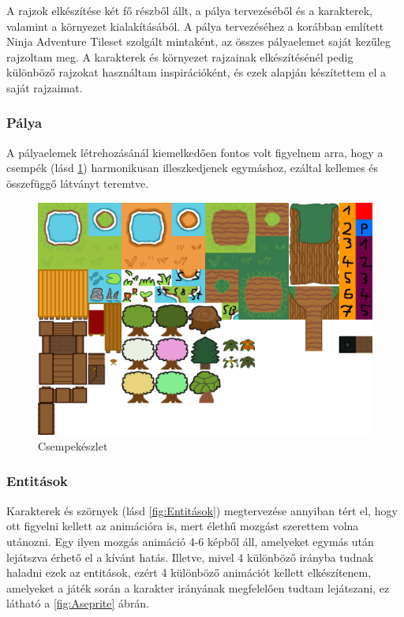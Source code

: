  A rajzok elkészítése két fő részből állt, a pálya tervezéséből és a karakterek, valamint a környezet kialakításából. A pálya tervezéséhez a korábban említett Ninja Adventure Tileset szolgált mintaként, az összes pályaelemet saját kezűleg rajzoltam meg. A karakterek és környezet rajzainak elkészítésénél pedig különböző rajzokat használtam inspirációként, és ezek alapján készítettem el a saját rajzaimat.

\subsubsection{Pálya}
 A pályaelemek létrehozásánál kiemelkedően fontos volt figyelnem arra, hogy a csempék (lásd \ref{fig:Csempekészlet}) harmonikusan illeszkedjenek egymáshoz, ezáltal kellemes és összefüggő látványt teremtve.

\begin{figure}[H]
    \centering
    \includegraphics[width=12.0truecm]{images/tileset.png}
    \caption{Csempekészlet}
    \label{fig:Csempekészlet}
\end{figure}

\subsubsection{Entitások}
 Karakterek és szörnyek (lásd \ref{fig:Entitások}) megtervezése annyiban tért el, hogy ott figyelni kellett az animációra is, mert élethű mozgást szerettem volna utánozni. Egy ilyen mozgás animáció 4-6 képből áll, amelyeket egymás után lejátszva érhető el a kívánt hatás. Illetve, mivel 4 különböző irányba tudnak haladni ezek az entitások, ezért 4 különböző animációt kellett elkészítenem, amelyeket a játék során a karakter irányának megfelelően tudtam lejátszani, ez látható a \ref{fig:Aseprite} ábrán.

